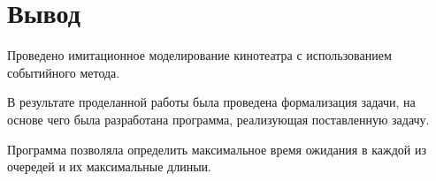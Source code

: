 \documentclass[a4paper,12pt]{article}
\begin{document}
	
	
	\section*{Вывод}
	
	Проведено имитационное моделирование кинотеатра с использованием событийного метода.
	
	В результате проделанной работы была проведена формализация задачи, на основе чего была разработана программа, реализующая поставленную задачу.
	
	Программа позволяла определить максимальное время ожидания в каждой из очередей и их максимальные длиныи.
	
\end{document}

